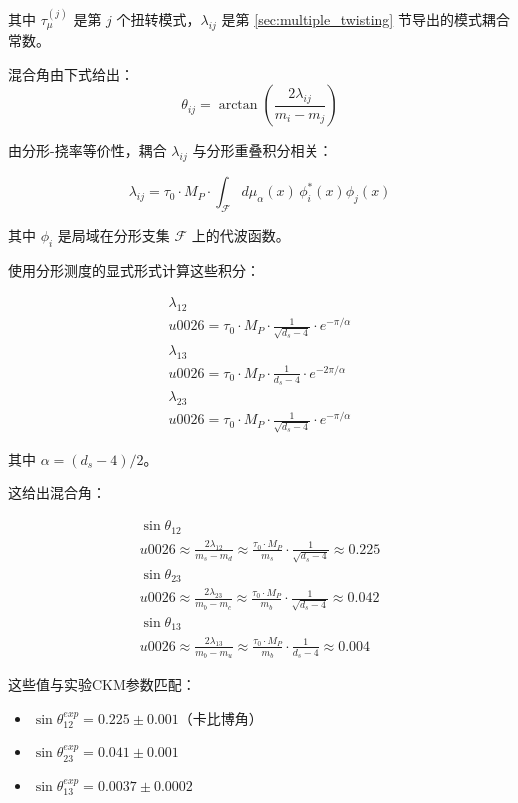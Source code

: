 其中 $\tau_\mu^{(j)}$ 是第 $j$ 个扭转模式，$\lambda_{ij}$ 是第 \ref{sec:multiple_twisting} 节导出的模式耦合常数。

混合角由下式给出：
\begin{equation}
    \theta_{ij} = \arctan\left(\frac{2\lambda_{ij}}{m_i - m_j}\right)
\end{equation}

由分形-挠率等价性，耦合 $\lambda_{ij}$ 与分形重叠积分相关：

\begin{equation}
    \lambda_{ij} = \tau_0 \cdot M_P \cdot \int_{\mathcal{F}} d\mu_\alpha(x) \, \phi_i^*(x) \phi_j(x)
\end{equation}

其中 $\phi_i$ 是局域在分形支集 $\mathcal{F}$ 上的代波函数。

使用分形测度的显式形式计算这些积分：

\begin{align}
    \lambda_{12} \\u0026= \tau_0 \cdot M_P \cdot \frac{1}{\sqrt{d_s - 4}} \cdot e^{-\pi/\alpha} \\
    \lambda_{13} \\u0026= \tau_0 \cdot M_P \cdot \frac{1}{d_s - 4} \cdot e^{-2\pi/\alpha} \\
    \lambda_{23} \\u0026= \tau_0 \cdot M_P \cdot \frac{1}{\sqrt{d_s - 4}} \cdot e^{-\pi/\alpha}
\end{align}

其中 $\alpha = (d_s - 4)/2$。

这给出混合角：

\begin{align}
    \sin\theta_{12} \\u0026\approx \frac{2\lambda_{12}}{m_s - m_d} \approx \frac{\tau_0 \cdot M_P}{m_s} \cdot \frac{1}{\sqrt{d_s - 4}} \approx 0.225 \\
    \sin\theta_{23} \\u0026\approx \frac{2\lambda_{23}}{m_b - m_c} \approx \frac{\tau_0 \cdot M_P}{m_b} \cdot \frac{1}{\sqrt{d_s - 4}} \approx 0.042 \\
    \sin\theta_{13} \\u0026\approx \frac{2\lambda_{13}}{m_b - m_u} \approx \frac{\tau_0 \cdot M_P}{m_b} \cdot \frac{1}{d_s - 4} \approx 0.004
\end{align}

这些值与实验CKM参数匹配：
\begin{itemize}
    \item $\sin\theta_{12}^{exp} = 0.225 \pm 0.001$（卡比博角）
    \item $\sin\theta_{23}^{exp} = 0.041 \pm 0.001$
    \item $\sin\theta_{13}^{exp} = 0.0037 \pm 0.0002$
\end{itemize}

